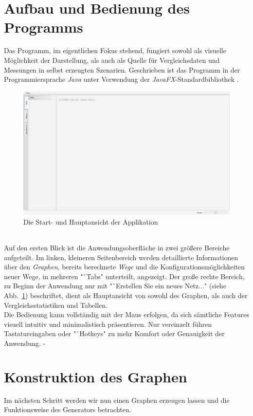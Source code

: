 \documentclass[12pt]{article}
\begin{document}
\section{Aufbau und Bedienung des Programms}
Das Programm, im eigentlichen Fokus stehend, fungiert sowohl als visuelle Möglichkeit der Darstellung, als auch als Quelle für Vergleichsdaten und Messungen in selbst erzeugten Szenarien.
Geschrieben ist das Programm in der Programmiersprache \textit{Java} unter Verwendung der \textit{JavaFX}-Standardbibliothek \cite{javafx}.
\begin{figure}[h!]
\includegraphics[width=\textwidth]{res/main_screenshot.png}
\centering
\caption{Die Start- und Hauptansicht der Applikation}
\label{fig:main_screenshot}
\end{figure}
\\
Auf den ersten Blick ist die Anwendungsoberfläche in zwei größere Bereiche aufgeteilt. Im linken, kleineren Seitenbereich werden detaillierte Informationen über den \textit{Graphen}, bereits berechnete \textit{Wege} und die Konfigurationsmöglichkeiten neuer Wege, in mehreren "`Tabs" unterteilt, angezeigt. Der große rechte Bereich, zu Beginn der Anwendung nur mit "`Erstellen Sie ein neues Netz..." (siehe Abb.~\ref{fig:main_screenshot}) beschriftet, dient als Hauptansicht von sowohl des Graphen, als auch der Vergleichsstatistiken und Tabellen.
\\
Die Bedienung kann vollständig mit der Maus erfolgen, da sich sämtliche Features visuell intuitiv und minimalistisch präsentieren. Nur vereinzelt führen Tastatureingaben oder "`Hotkeys" zu mehr Komfort oder Genauigkeit der Anwendung. 
\newpage
-
\newpage
\section{Konstruktion des Graphen}
Im nächsten Schritt werden wir nun einen Graphen erzeugen lassen und die Funktionsweise des Generators betrachten.
\newpage
\end{document}
